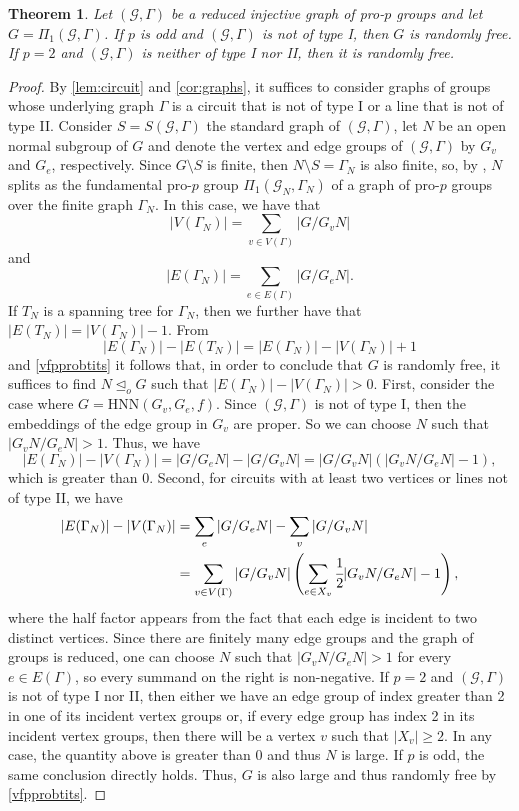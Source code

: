 \documentclass[a4paper,10pt]{amsart}
\theoremstyle{plain}
\newtheorem{thm}{Theorem}[section]
\theoremstyle{definition}
\numberwithin{equation}{section}
\begin{document}
\begin{thm}\label{thm:graphs_of_groups}
     Let $(\mathcal G, \Gamma)$ be a reduced injective graph of pro-$p$ groups and let $G=\Pi_1(\mathcal G, \Gamma)$. If $p$ is odd and $(\mathcal G, \Gamma)$ is not of type I, then $G$ is randomly free. If $p=2$ and $(\mathcal G, \Gamma)$ is neither of type I nor II, then it is randomly free.
\end{thm}
\begin{proof}
    By \cref{lem:circuit} and \cref{cor:graphs}, it suffices to consider graphs of groups whose underlying graph $\Gamma$ is a circuit that is not of type I or a line that is not of type II. Consider $S = S(\mathcal G, \Gamma)$ the standard graph of $(\mathcal G, \Gamma)$, let $N$ be an open normal subgroup of $G$ and denote the vertex and edge groups of $(\mathcal G, \Gamma)$ by $G_v$ and $G_e$, respectively. Since $G \setminus S$ is finite, then $N \setminus S = \Gamma_N$ is also finite, so, by \cite[Theorem 6.6.1]{R17}, $N$ splits as the fundamental pro-$p$ group $\Pi_1(\mathcal G_N,\Gamma_N)$ of a graph of pro-$p$ groups over the finite graph $\Gamma_N$. In this case, we have that
    \[|V(\Gamma_N)| = \sum_{v \in V(\Gamma)} |G/G_vN|\]
    and
    \[|E(\Gamma_N)| = \sum_{e \in E(\Gamma)} |G/G_eN|.\]
    If $T_N$ is a spanning tree for $\Gamma_N$, then we further have that $|E(T_N)|=|V(\Gamma_N)|-1$. From
    \[|E(\Gamma_N)|-|E(T_N)| = |E(\Gamma_N)|-|V(\Gamma_N)|+1\]
    and \cref{vfpprobtits} it follows that, in order to conclude that $G$ is randomly free, it suffices to find $N\unlhd_o G$ such that $|E(\Gamma_N)|-|V(\Gamma_N)|> 0$. First, consider the case where $G=\mathrm{HNN}(G_v,G_e,f)$. Since $(\mathcal G, \Gamma)$ is not of type I, then the embeddings of the edge group in $G_v$ are proper. So we can choose $N$ such that $|G_vN/G_eN| > 1$. Thus, we have
    \[|E(\Gamma_N)|-|V(\Gamma_N)| = |G/G_eN|- |G/G_vN| = |G/G_vN|(|G_vN/G_eN|-1),\]
    which is greater than 0. Second, for circuits with at least two vertices or lines not of type II, we have
    \begin{align*}
        |E(\Gamma_N)|-|V(\Gamma_N)| & = \sum_e |G/G_eN|- \sum_v |G/G_vN| \\ & = \sum_{v \in V(\Gamma)}|G/G_vN|\left(\sum_{e\in X_v}\cfrac{1}{2}|G_vN/G_eN|-1 \right),
    \end{align*}
    where the half factor appears from the fact that each edge is incident to two distinct vertices. Since there are finitely many edge groups and the graph of groups is reduced, one can choose $N$ such that $|G_vN/G_eN| > 1$ for every $e \in E(\Gamma)$, so every summand on the right is non-negative. If $p=2$ and $(\mathcal G, \Gamma)$ is not of type I nor II, then either we have an edge group of index greater than 2 in one of its incident vertex groups or, if every edge group has index 2 in its incident vertex groups, then there will be a vertex $v$ such that $|X_v| \geq 2$. In any case, the quantity above is greater than 0 and thus $N$ is large. If $p$ is odd, the same conclusion directly holds. Thus, $G$ is also large and thus randomly free by \cref{vfpprobtits}.
\end{proof}
\end{document}
